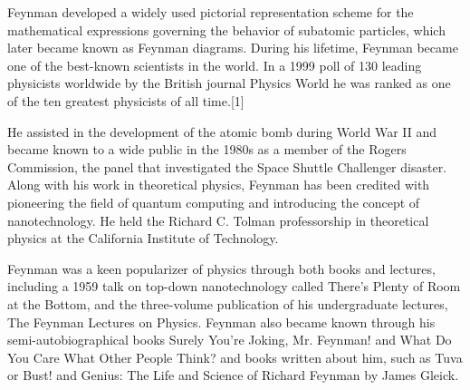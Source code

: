 Feynman developed a widely used pictorial representation scheme for the mathematical expressions governing the behavior of subatomic particles, which later became known as Feynman diagrams. During his lifetime, Feynman became one of the best-known scientists in the world. In a 1999 poll of 130 leading physicists worldwide by the British journal Physics World he was ranked as one of the ten greatest physicists of all time.[1]

He assisted in the development of the atomic bomb during World War II and became known to a wide public in the 1980s as a member of the Rogers Commission, the panel that investigated the Space Shuttle Challenger disaster. Along with his work in theoretical physics, Feynman has been credited with pioneering the field of quantum computing and introducing the concept of nanotechnology. He held the Richard C. Tolman professorship in theoretical physics at the California Institute of Technology.

Feynman was a keen popularizer of physics through both books and lectures, including a 1959 talk on top-down nanotechnology called There's Plenty of Room at the Bottom, and the three-volume publication of his undergraduate lectures, The Feynman Lectures on Physics. Feynman also became known through his semi-autobiographical books Surely You're Joking, Mr. Feynman! and What Do You Care What Other People Think? and books written about him, such as Tuva or Bust! and Genius: The Life and Science of Richard Feynman by James Gleick.
